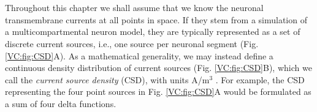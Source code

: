 \section{}
\label{sec:VC:main}
Throughout this chapter we shall assume that we know the neuronal transmembrane currents at all points in space. If they stem from a simulation of a multicompartmental neuron model, they are typically represented as a set of discrete current sources, i.e., one source per neuronal segment (Fig. \ref{VC:fig:CSD}A). As a mathematical generality, we may instead define a continuous density distribution  of current sources (Fig. \ref{VC:fig:CSD}B), which we call the \textit{current source density} (CSD), with units A/m$^3$ . For example, the CSD representing the four point sources in Fig. \ref{VC:fig:CSD}A would be formulated as a sum of four delta functions.

